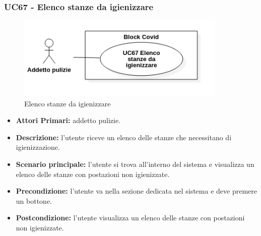 \subsubsection{UC67 - Elenco stanze da igienizzare}
\begin{figure}[H]
		\centering
		\includegraphics[width=10cm]{res/images/UC67.png}
		\caption{Elenco stanze da igienizzare}
		\label{fig:Elenco stanze da igienizzare}
	\end{figure}
\begin{itemize}
           	\item\textbf{Attori Primari:} addetto pulizie.
           	\item\textbf{Descrizione:} l'utente riceve un elenco delle stanze che necessitano di igienizzazione.
           	\item\textbf{Scenario principale:} l'utente si trova all'interno del sistema e visualizza un elenco delle stanze con postazioni non igienizzate.
           	\item\textbf{Precondizione:} l'utente va nella sezione dedicata nel sistema e deve premere un bottone.
           	\item\textbf{Postcondizione:} l'utente visualizza un elenco delle stanze con postazioni non igienizzate.
\end{itemize}

